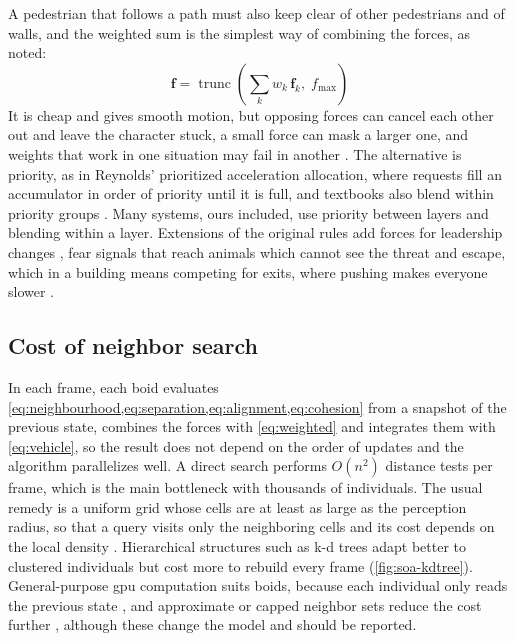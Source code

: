 A pedestrian that follows a path must also keep clear of other pedestrians and of walls, and the weighted sum is the simplest way of combining the forces, as \citet{reynolds1999steering} noted:
\begin{equation}
\boxed{\mathbf{f} = \operatorname{trunc}\!\left(\sum_{k} w_k\,\mathbf{f}_k,\; f_{\max}\right)}
\label{eq:weighted}
\end{equation}
It is cheap and gives smooth motion, but opposing forces can cancel each other out and leave the character stuck, a small force can mask a larger one, and weights that work in one situation may fail in another \citep{millington2019ai}. The alternative is priority, as in Reynolds' prioritized acceleration allocation, where requests fill an accumulator in order of priority until it is full, and textbooks also blend within priority groups \citep{millington2019ai}. Many systems, ours included, use priority between layers and blending within a layer. Extensions of the original rules add forces for leadership changes \citep{hartman2006autonomous}, fear signals that reach animals which cannot see the threat \citep{delgadomata2007fear} and escape, which in a building means competing for exits, where pushing makes everyone slower \citep{helbing2000simulating}.

\subsection{Cost of neighbor search}\label{sub:complexity}

In each frame, each boid evaluates \cref{eq:neighbourhood,eq:separation,eq:alignment,eq:cohesion} from a snapshot of the previous state, combines the forces with \cref{eq:weighted} and integrates them with \cref{eq:vehicle}, so the result does not depend on the order of updates and the algorithm parallelizes well. A direct search performs $O(n^2)$ distance tests per frame, which is the main bottleneck with thousands of individuals. The usual remedy is a uniform grid whose cells are at least as large as the perception radius, so that a query visits only the neighboring cells and its cost depends on the local density \citep{ericson2004realtime,reynolds2006big}. Hierarchical structures such as k-d trees \citep{bentley1975multidimensional} adapt better to clustered individuals but cost more to rebuild every frame (\cref{fig:soa-kdtree}). General-purpose \gls{gpu} computation suits boids, because each individual only reads the previous state \citep{owens2007survey,joselli2009neighborhood}, and approximate or capped neighbor sets reduce the cost further \citep{joselli2009neighborhood,silva2009boids}, although these change the model and should be reported.

